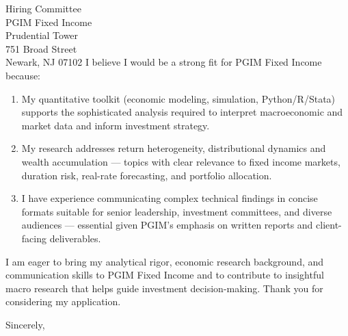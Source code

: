 \documentclass[11pt,letterpaper]{letter}
\begin{document}
\begin{letter}{Hiring Committee \\
PGIM Fixed Income \\
Prudential Tower \\
751 Broad Street \\  
Newark, NJ 07102}
I believe I would be a strong fit for PGIM Fixed Income because:
\begin{enumerate}
  \item My quantitative toolkit (economic modeling, simulation, Python/R/Stata) supports the sophisticated analysis required to interpret macroeconomic and market data and inform investment strategy.
  \item My research addresses return heterogeneity, distributional dynamics and wealth accumulation — topics with clear relevance to fixed income markets, duration risk, real-rate forecasting, and portfolio allocation.
  \item I have experience communicating complex technical findings in concise formats suitable for senior leadership, investment committees, and diverse audiences — essential given PGIM’s emphasis on written reports and client-facing deliverables.
\end{enumerate}

I am eager to bring my analytical rigor, economic research background, and communication skills to PGIM Fixed Income and to contribute to insightful macro research that helps guide investment decision-making. Thank you for considering my application.

\closing{Sincerely,}

\end{letter}
\end{document}
